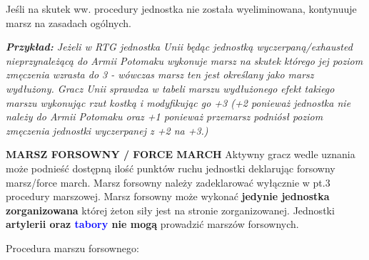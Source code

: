 Jeśli na skutek ww. procedury jednostka nie została wyeliminowana, kontynuuje marsz na zasadach ogólnych.\par
\textit{\textbf{Przykład:} Jeżeli w RTG jednostka Unii będąc jednostką wyczerpaną/exhausted nieprzynależącą do Armii Potomaku wykonuje marsz na skutek którego jej poziom zmęczenia wzrasta do 3 - wówczas marsz ten jest określany jako marsz wydłużony. Gracz Unii sprawdza w tabeli marszu wydłużonego efekt takiego marszu wykonując rzut kostką i modyfikując go +3 (+2 ponieważ jednostka nie należy do Armii Potomaku oraz +1 ponieważ przemarsz podniósł poziom zmęczenia jednostki wyczerpanej z +2 na +3.)}
	
\bigbreak
\textbf{MARSZ FORSOWNY / FORCE MARCH}
\bigbreak
Aktywny gracz wedle uznania może podnieść dostępną ilość punktów ruchu jednostki deklarując forsowny marsz/force march.
Marsz forsowny należy zadeklarować wyłącznie w pt.3 procedury marszowej.
Marsz forsowny może wykonać \textbf{jedynie jednostka zorganizowana} której żeton siły jest na stronie zorganizowanej.
Jednostki \textbf{artylerii oraz \textcolor{blue}{tabory} nie mogą} prowadzić marszów forsownych.\par
Procedura marszu forsownego:
